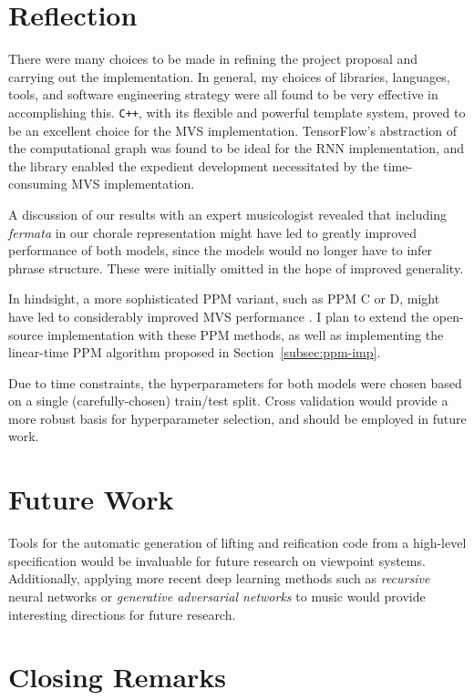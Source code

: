 \documentclass[12pt,a4paper,twoside,openright]{report}
\begin{document}
\section{Reflection}

There were many choices to be made in refining the project proposal and carrying
out the implementation. In general, my choices of libraries, languages, tools,
and software engineering strategy were all found to be very effective in
accomplishing this. \texttt{C++}, with its flexible and powerful template
system, proved to be an excellent choice for the MVS implementation.
TensorFlow's abstraction of the computational graph was found to be ideal for
the RNN implementation, and the library enabled the expedient development
necessitated by the time-consuming MVS implementation.

A discussion of our results with an expert musicologist revealed that including
\emph{fermata} in our chorale representation might have led to greatly improved
performance of both models, since the models would no longer have to infer
phrase structure. These were initially omitted in the hope of improved
generality.

In hindsight, a more sophisticated PPM variant, such as PPM C or D, might have
led to considerably improved MVS performance \cite{pearce2004combining}. I plan
to extend the open-source implementation with these PPM methods, as well as
implementing the linear-time PPM algorithm proposed in
Section~\ref{subsec:ppm-imp}.

Due to time constraints, the hyperparameters for both models were chosen based
on a single (carefully-chosen) train/test split.  Cross validation would provide
a more robust basis for hyperparameter selection, and should be employed in
future work.

\section{Future Work}

Tools for the automatic generation of lifting and reification code from a
high-level specification would be invaluable for future research on viewpoint
systems. Additionally, applying more recent deep learning methods such as
\emph{recursive} neural networks or \emph{generative adversarial networks} to
music would provide interesting directions for future research.


\section{Closing Remarks}
\end{document}
